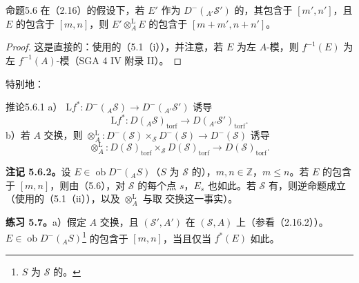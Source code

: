 \begin{SGAresult}{命题}{5.6}
在（2.16）的假设下，若 $E'$ 作为 $D^-({}_{A'}\mathscr S')$ 的，其包含于 $[m',n']$，且 $E$ 的包含于 $[m,n]$，则 $E'\otimes_A^{\mathrm L}E$ 的包含于 $[m+m',n+n']$。
\end{SGAresult}
\begin{proof}
这是直接的：使用的（5.1（i）），并注意，若 $E$ 为左 $A$-模，则 $f^{-1}(E)$ 为左 $f^{-1}(A)$-模（SGA 4 IV 附录 II）。
\end{proof}
特别地：
\begin{SGAresult}{推论}{5.6.1}
a） $\mathrm Lf^*:D^-({}_A\mathscr S)\to D^-({}_{A'}\mathscr S')$ 诱导
\[\mathrm Lf^*:D({}_A\mathscr S)_{\mathrm{torf}}\longrightarrow D({}_{A'}\mathscr S')_{\mathrm{torf}}.\]
b）若 $A$ 交换，则 $\otimes_A^{\mathrm L}:D^-(\mathscr S)\times_{\mathscr S}D^-(\mathscr S)\to D^-(\mathscr S)$ 诱导
\[\otimes_A^{\mathrm L}:D(\mathscr S)_{\mathrm{torf}}\times_{\mathscr S}D(\mathscr S)_{\mathrm{torf}}\longrightarrow D(\mathscr S)_{\mathrm{torf}}.\]
\end{SGAresult}

\textbf{注记 5.6.2。}设 $E\in\operatorname{ob}D^-({}_AS)$（$S$ 为 $\mathscr S$ 的），$m,n\in\mathbb Z$，$m\leq n$。若 $E$ 的包含于 $[m,n]$，则由（5.6），对 $\mathscr S$ 的每个点 $s$，$E_s$ 也如此。若 $\mathscr S$ 有，则逆命题成立（使用的（5.1（ii）），以及 $\otimes_A^{\mathrm L}$ 与取
交换这一事实）。

\textbf{练习 5.7。}a）假定 $A$ 交换，且 $(\mathscr S',A')$ 在 $(\mathscr S,A)$ 上（参看（2.16.2））。$E\in\operatorname{ob}D^-({}_AS)$\footnote{$S$ 为 $\mathscr S$ 的。} 的包含于 $[m,n]$，当且仅当 $f^*(E)$ 如此。

